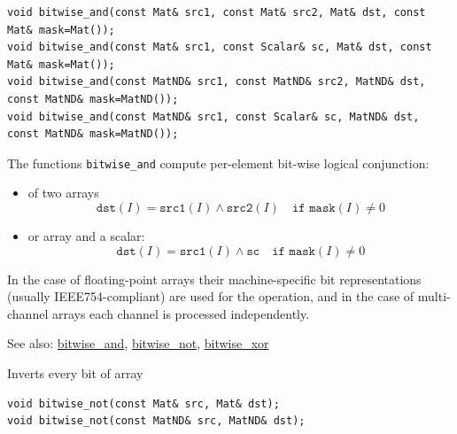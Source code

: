 \begin{lstlisting}
void bitwise_and(const Mat& src1, const Mat& src2, Mat& dst, const Mat& mask=Mat());
void bitwise_and(const Mat& src1, const Scalar& sc, Mat& dst, const Mat& mask=Mat());
void bitwise_and(const MatND& src1, const MatND& src2, MatND& dst, const MatND& mask=MatND());
void bitwise_and(const MatND& src1, const Scalar& sc, MatND& dst, const MatND& mask=MatND());
\end{lstlisting}
\begin{description}
\end{description}

The functions \texttt{bitwise\_and} compute per-element bit-wise logical conjunction:
\begin{itemize}
    \item of two arrays
    \[\texttt{dst}(I) = \texttt{src1}(I) \wedge \texttt{src2}(I)\quad\texttt{if mask}(I)\ne0\]
    \item or array and a scalar:
    \[\texttt{dst}(I) = \texttt{src1}(I) \wedge \texttt{sc}\quad\texttt{if mask}(I)\ne0\]
\end{itemize}

In the case of floating-point arrays their machine-specific bit representations (usually IEEE754-compliant) are used for the operation, and in the case of multi-channel arrays each channel is processed independently.

See also: \hyperref[bitwise.and]{bitwise\_and}, \hyperref[bitwise.not]{bitwise\_not}, \hyperref[bitwise.xor]{bitwise\_xor}

Inverts every bit of array

\begin{lstlisting}
void bitwise_not(const Mat& src, Mat& dst);
void bitwise_not(const MatND& src, MatND& dst);
\end{lstlisting}
\begin{description}
\end{description}

